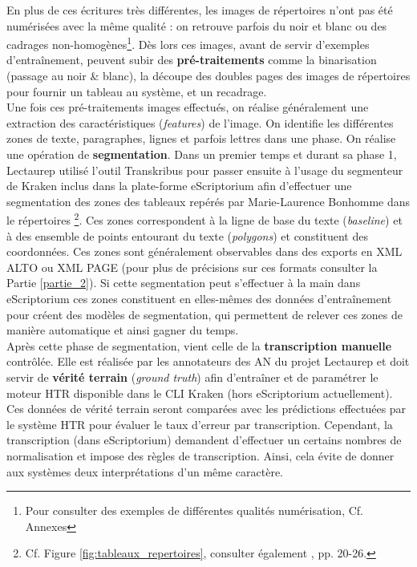 \clearpage
En plus de ces écritures très différentes, les images de répertoires n'ont pas été numérisées avec la même qualité : on retrouve parfois du noir et blanc ou des cadrages non-homogènes\footnote{Pour consulter des exemples de différentes qualités numérisation, Cf. Annexes }. Dès lors ces images, avant de servir d'exemples d'entraînement, peuvent subir des \textbf{pré-traitements} comme la binarisation (passage au noir \& blanc), la découpe des doubles pages des images de répertoires pour fournir un tableau au système, et un recadrage.\\

Une fois ces pré-traitements images effectués, on réalise généralement une extraction des caractéristiques (\textit{features}) de l'image. On identifie les différentes zones de texte, paragraphes, lignes et parfois lettres dans une phase. On réalise une opération de \textbf{segmentation}. Dans un premier temps et durant sa phase 1, Lectaurep utilisé l'outil Transkribus pour passer ensuite à l'usage du segmenteur de Kraken inclus dans la plate-forme eScriptorium afin d'effectuer une segmentation des zones des tableaux repérés par Marie-Laurence Bonhomme dans le répertoires \footnote{Cf. Figure \ref{fig:tableaux_repertoires}, consulter également \cite{bonhomme_defis_2018}, pp. 20-26.}. Ces zones correspondent à la ligne de base du texte (\textit{baseline}) et à des ensemble de points entourant du texte (\textit{polygons}) et constituent des coordonnées. Ces zones sont généralement observables dans des exports en XML ALTO ou XML PAGE (pour plus de précisions sur ces formats consulter la Partie \ref{partie_2}). Si cette segmentation peut s'effectuer à la main dans eScriptorium ces zones constituent en elles-mêmes des données d'entraînement pour créent des modèles de segmentation, qui permettent de relever ces zones de manière automatique et ainsi gagner du temps. \\

Après cette phase de segmentation, vient celle de la \textbf{transcription manuelle} contrôlée. Elle est réalisée par les annotateurs des AN du projet Lectaurep et doit servir de \textbf{vérité terrain} (\textit{ground truth}) afin d'entraîner et de paramétrer le moteur HTR disponible dans le CLI Kraken (hors eScriptorium actuellement). Ces données de vérité terrain seront comparées avec les prédictions effectuées par le système HTR pour évaluer le taux d'erreur par transcription. Cependant, la transcription  (dans eScriptorium) demandent d'effectuer un certains nombres de normalisation et impose des règles de transcription. Ainsi, cela évite de donner aux systèmes deux interprétations d'un même caractère. \\

